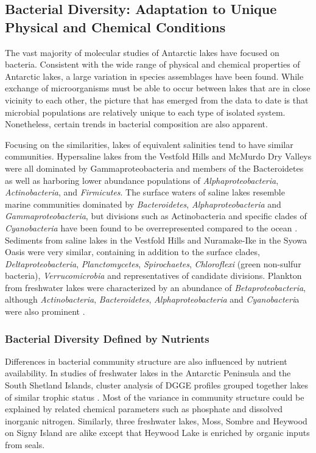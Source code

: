 \subsection{Bacterial Diversity: Adaptation to Unique Physical and Chemical Conditions}
The vast majority of molecular studies of Antarctic lakes have focused on bacteria.
Consistent with the wide range of physical and chemical properties of Antarctic lakes, a large variation in species assemblages have been found.
While exchange of microorganisms must be able to occur between lakes that are in close vicinity to each other, 
the picture that has emerged from the data to date is that microbial populations are relatively unique to each type of isolated system. 
Nonetheless, certain trends in bacterial composition are also apparent.

Focusing on the similarities, lakes of equivalent salinities tend to have similar communities.
Hypersaline lakes from the Vestfold Hills \cite{Bowman2000b} and McMurdo Dry Valleys \cite{Glatz2006, Mosier2007} were all dominated by Gammaproteobacteria and members of the Bacteroidetes
 as well as harboring lower abundance populations of \textit{Alphaproteobacteria}, \textit{Actinobacteria}, and \textit{Firmicutes}.
The surface waters of saline lakes resemble marine communities dominated by \textit{Bacteroidetes}, \textit{Alphaproteobacteria} and \textit{Gammaproteobacteria},
 but divisions such as Actinobacteria and specific clades of \textit{Cyanobacteria} have been found to be overrepresented compared to the ocean \cite{Lauro2011}.
Sediments from saline lakes in the Vestfold Hills \cite{Bowman2000a} and Nuramake-Ike in the Syowa Oasis \cite{Kurasawa2010} were very similar, 
containing in addition to the surface clades, \textit{Deltaproteobacteria}, \textit{Planctomycetes}, \textit{Spirochaetes}, \textit{Chloroflexi} (green non-sulfur bacteria), \textit{Verrucomicrobia} and representatives of candidate divisions.
Plankton from freshwater lakes were characterized by an abundance of \textit{Betaproteobacteria}, although \textit{Actinobacteria}, \textit{Bacteroidetes}, \textit{Alphaproteobacteria} and \textit{Cyanobacteri}a were also prominent \cite{Pearce2003, Pearce2005, Pearce2005, Schiaffino2009}. 

\subsubsection{Bacterial Diversity Defined by Nutrients}
Differences in bacterial community structure are also influenced by nutrient availability.
In studies of freshwater lakes in the Antarctic Peninsula and the South Shetland Islands, cluster analysis of DGGE profiles grouped together lakes of similar trophic status 
\cite{Schiaffino2009, Villaescusa2010}.
Most of the variance in community structure could be explained by related chemical parameters such as phosphate and dissolved inorganic nitrogen.
Similarly, three freshwater lakes, Moss, Sombre and Heywood on Signy Island are alike except that Heywood Lake is enriched by organic inputs from seals.

